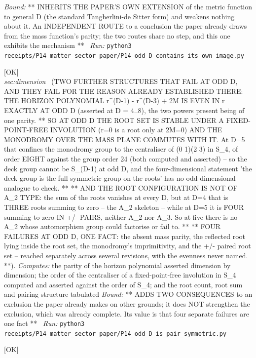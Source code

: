 \begin{description}
 \emph{Bound:} ** INHERITS THE PAPER'S OWN EXTENSION of the metric function to general D (the standard Tangherlini-de Sitter form) and weakens nothing about it. An INDEPENDENT ROUTE to a conclusion the paper already draws from the mass function's parity; the two routes share no step, and this one exhibits the mechanism **
\ \emph{Run:} \texttt{python3 receipts/P14\_matter\_sector\_paper/P14\_odd\_D\_contains\_its\_own\_image.py}
\item[\label{rcpt:P14_odd_D_is_pair_symmetric}\texttt{P14\_odd\_D\_is\_pair\_symmetric}]\hfill\textsf{[OK]}\\
\textit{sec:dimension} \ (TWO FURTHER STRUCTURES THAT FAIL AT ODD D, AND THEY FAIL FOR THE REASON ALREADY ESTABLISHED THERE: THE HORIZON POLYNOMIAL r\textasciicircum{}(D-1) - r\textasciicircum{}(D-3) + 2M IS EVEN IN r EXACTLY AT ODD D (asserted at D = 4..8), the two powers present being of one parity. ** SO AT ODD D THE ROOT SET IS STABLE UNDER A FIXED-POINT-FREE INVOLUTION (r=0 is a root only at 2M=0) AND THE MONODROMY OVER THE MASS PLANE COMMUTES WITH IT. At D=5 that confines the monodromy group to the centraliser of (0 1)(2 3) in S\_4, of order EIGHT against the group order 24 (both computed and asserted) -- so the deck group cannot be S\_(D-1) at odd D, and the four-dimensional statement 'the deck group is the full symmetric group on the roots' has no odd-dimensional analogue to check. ** ** AND THE ROOT CONFIGURATION IS NOT OF A\_2 TYPE: the sum of the roots vanishes at every D, but at D=4 that is THREE roots summing to zero -- the A\_2 skeleton -- while at D=5 it is FOUR summing to zero IN +/- PAIRS, neither A\_2 nor A\_3. So at five there is no A\_2 whose automorphism group could factorise or fail to. ** ** FOUR FAILURES AT ODD D, ONE FACT: the absent mass parity, the reflected root lying inside the root set, the monodromy's imprimitivity, and the +/- paired root set -- reached separately across several revisions, with the evenness never named. **). 
\emph{Computes:} the parity of the horizon polynomial asserted dimension by dimension; the order of the centraliser of a fixed-point-free involution in S\_4 computed and asserted against the order of S\_4; and the root count, root sum and pairing structure tabulated
 \emph{Bound:} ** ADDS TWO CONSEQUENCES to an exclusion the paper already makes on other grounds; it does NOT strengthen the exclusion, which was already complete. Its value is that four separate failures are one fact **
\ \emph{Run:} \texttt{python3 receipts/P14\_matter\_sector\_paper/P14\_odd\_D\_is\_pair\_symmetric.py}
\item[\label{rcpt:P14_p3_already_said_it}\texttt{P14\_p3\_already\_said\_it}]\hfill\textsf{[OK]}\\

\end{description}
